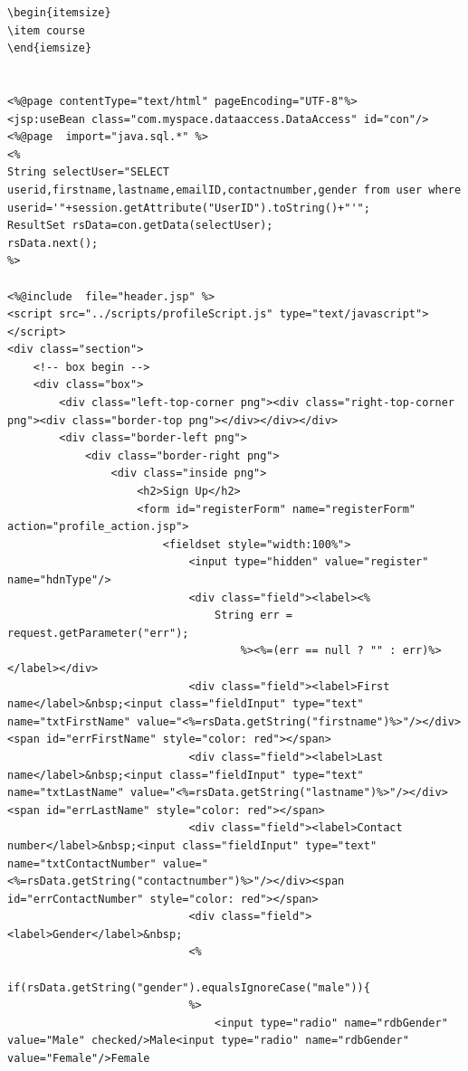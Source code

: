 \documentclass[a4paper,12pt]{article}
\begin{document}
\begin{verbatim}
\begin{itemsize}
\item course
\end{iemsize}

   
<%@page contentType="text/html" pageEncoding="UTF-8"%>
<jsp:useBean class="com.myspace.dataaccess.DataAccess" id="con"/> 
<%@page  import="java.sql.*" %>
<%
String selectUser="SELECT userid,firstname,lastname,emailID,contactnumber,gender from user where userid='"+session.getAttribute("UserID").toString()+"'";
ResultSet rsData=con.getData(selectUser);
rsData.next();
%>

<%@include  file="header.jsp" %>
<script src="../scripts/profileScript.js" type="text/javascript"></script>
<div class="section">
    <!-- box begin -->
    <div class="box">
        <div class="left-top-corner png"><div class="right-top-corner png"><div class="border-top png"></div></div></div>
        <div class="border-left png">
            <div class="border-right png">
                <div class="inside png">
                    <h2>Sign Up</h2>
                    <form id="registerForm" name="registerForm"  action="profile_action.jsp">
                        <fieldset style="width:100%">
                            <input type="hidden" value="register" name="hdnType"/>
                            <div class="field"><label><%
                                String err = request.getParameter("err");
                                    %><%=(err == null ? "" : err)%></label></div>
                            <div class="field"><label>First name</label>&nbsp;<input class="fieldInput" type="text" name="txtFirstName" value="<%=rsData.getString("firstname")%>"/></div><span id="errFirstName" style="color: red"></span>
                            <div class="field"><label>Last name</label>&nbsp;<input class="fieldInput" type="text" name="txtLastName" value="<%=rsData.getString("lastname")%>"/></div><span id="errLastName" style="color: red"></span>
                            <div class="field"><label>Contact number</label>&nbsp;<input class="fieldInput" type="text" name="txtContactNumber" value="<%=rsData.getString("contactnumber")%>"/></div><span id="errContactNumber" style="color: red"></span>
                            <div class="field"><label>Gender</label>&nbsp;
                            <%
                            if(rsData.getString("gender").equalsIgnoreCase("male")){
                            %>    
                                <input type="radio" name="rdbGender" value="Male" checked/>Male<input type="radio" name="rdbGender" value="Female"/>Female

\end{verbatim}
\end{document}
